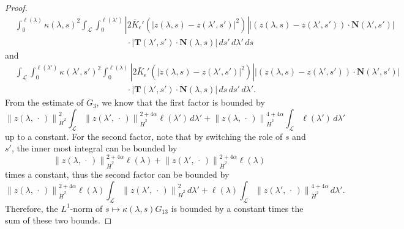 \documentclass[reqno,centertags,12pt]{amsart}
\theoremstyle{definition}
\numberwithin{equation}{section}
\newcommand{\abs}[1]{\left\lvert#1\right\rvert}
\newcommand{\norm}[1]{\left\|#1\right\|}
\begin{document}
\begin{proof}
    \begin{align*}
        &\int_{0}^{\ell(\lambda)}\kappa(\lambda,s)^{2}
        \int_{\mathcal{L}}\int_{0}^{\ell(\lambda')}
        \abs{2\bar{K}_{\epsilon}'\left(\abs{z(\lambda,s) - z(\lambda',s')}^{2}\right)}
        \abs{(z(\lambda,s) - z(\lambda',s'))\cdot\mathbf{N}(\lambda',s')}
        \\&\quad\quad\quad\quad\quad\quad\quad\quad\quad\quad\quad\quad\quad
        \cdot\abs{\mathbf{T}(\lambda',s')\cdot\mathbf{N}(\lambda,s)}
        \,ds'\,d\lambda'\,ds
    \end{align*}
    and
    \begin{align*}
        &\int_{\mathcal{L}}\int_{0}^{\ell(\lambda')}\kappa(\lambda',s')^{2}
        \int_{0}^{\ell(\lambda)}
        \abs{2\bar{K}_{\epsilon}'\left(\abs{z(\lambda,s) - z(\lambda',s')}^{2}\right)}
        \abs{(z(\lambda,s) - z(\lambda',s'))\cdot\mathbf{N}(\lambda',s')}
        \\&\quad\quad\quad\quad\quad\quad\quad\quad\quad\quad\quad\quad\quad
        \cdot\abs{\mathbf{T}(\lambda',s')\cdot\mathbf{N}(\lambda,s)}
        \,ds\,ds'\,d\lambda'.
    \end{align*}
    From the estimate of $G_{3}$, we know that the first factor is bounded by
    \[
        \norm{z(\lambda,\,\cdot\,)}_{\dot{H}^{2}}^{2}\int_{\mathcal{L}}
        \norm{z(\lambda',\,\cdot\,)}_{\dot{H}^{2}}^{2+4\alpha}\ell(\lambda')\,d\lambda'
        + \norm{z(\lambda,\,\cdot\,)}_{\dot{H}^{2}}^{4+4\alpha}
        \int_{\mathcal{L}}\ell(\lambda')\,d\lambda'
    \]
    up to a constant. For the second factor, note that by switching the role
    of $s$ and $s'$, the inner most integral can be bounded by
    \[
        \norm{z(\lambda,\,\cdot\,)}_{\dot{H}^{2}}^{2+4\alpha}\ell(\lambda)
        + \norm{z(\lambda',\,\cdot\,)}_{\dot{H}^{2}}^{2+4\alpha}\ell(\lambda)
    \]
    times a constant, thus the second factor can be bounded by
    \[
        \norm{z(\lambda,\,\cdot\,)}_{\dot{H}^{2}}^{2+4\alpha}\ell(\lambda)
        \int_{\mathcal{L}}\norm{z(\lambda',\,\cdot\,)}_{\dot{H}^{2}}^{2}\,d\lambda'
        + \ell(\lambda)\int_{\mathcal{L}}
        \norm{z(\lambda',\,\cdot\,)}_{\dot{H}^{2}}^{4+4\alpha}\,d\lambda'.
    \]
    Therefore, the $L^{1}$-norm of $s\mapsto\kappa(\lambda,s)G_{13}$ is bounded by
    a constant times the sum of these two bounds.


\end{proof}
\end{document}
